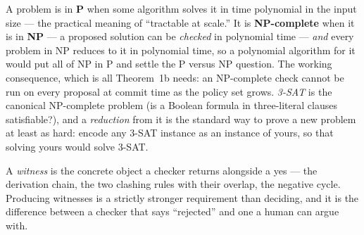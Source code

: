 \documentclass[11pt,a4paper]{article}
\begin{document}
A problem is in \textbf{P} when some algorithm solves it in time polynomial in the input size --- the practical meaning of
``tractable at scale.'' It is \textbf{NP-complete} when it is in \textbf{NP} --- a proposed solution can be \emph{checked} in
polynomial time --- \emph{and} every problem in NP reduces to it in polynomial time, so a polynomial algorithm for it would put
all of NP in P and settle the P versus NP question. The working
consequence, which is all Theorem~1b needs: an NP-complete check cannot be run on every proposal at commit time as the
policy set grows. \emph{3-SAT} is the canonical NP-complete problem (is a Boolean formula in three-literal clauses
satisfiable?), and a \emph{reduction} from it is the standard way to prove a new problem at least as hard: encode any 3-SAT
instance as an instance of yours, so that solving yours would solve 3-SAT.

A \emph{witness} is the concrete object a checker returns alongside a yes --- the derivation chain, the two clashing rules
with their overlap, the negative cycle. Producing witnesses is a strictly stronger requirement than deciding, and it is the
difference between a checker that says ``rejected'' and one a human can argue with.
\end{document}
